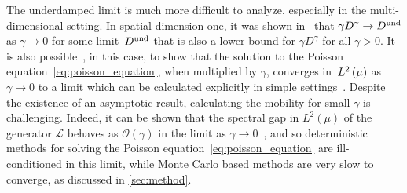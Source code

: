 \documentclass[11pt,a4paper]{article}
\begin{document}
The underdamped limit is much more difficult to analyze,
especially in the multi-dimensional setting.
In spatial dimension one, it was shown in~\cite{MR2394704} that $\gamma D^{\gamma} \to D^{\rm und}$ as $\gamma \to 0$ for some limit~$D^{\rm und}$
that is also a lower bound for $\gamma D^{\gamma}$ for all $\gamma > 0$.
It is also possible~\cite[Lemma~3.4]{MR2394704}, in this case,
to show that the solution to the Poisson equation~\eqref{eq:poisson_equation},
when multiplied by $\gamma$, converges in~$\lp{2}{\mu}$ as $\gamma \to 0$ to a limit
which can be calculated explicitly in simple settings~\cite{MR2427108}.
Despite the existence of an asymptotic result,
calculating the mobility for small $\gamma$ is challenging.
Indeed, it can be shown that the spectral gap in $L^2(\mu)$ of the generator $\mathcal L$ behaves as $\mathcal O(\gamma)$ in the limit as $\gamma \to 0$~\cite{MR2394704,MR3106879,MR3522857,roussel2018spectral},
and so deterministic methods for solving the Poisson equation~\eqref{eq:poisson_equation} are ill-conditioned in this limit,
while Monte Carlo based methods are very slow to converge,
as discussed in \cref{sec:method}.
\end{document}
